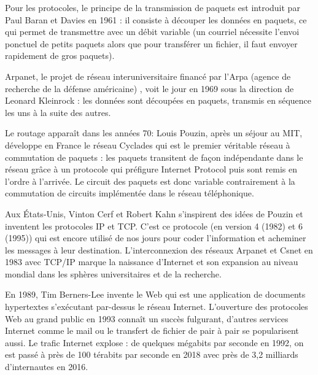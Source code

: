 \documentclass[a4paper,dvipsnames]{article}
\begin{document}
\smallskip

Pour les protocoles,
le principe de la {\color{red}transmission de paquets} est introduit par Paul Baran et Davies en 1961 : il consiste à découper les données en paquets, ce qui permet de transmettre avec un débit variable (un courriel nécessite l'envoi ponctuel de petits paquets alors que pour transférer un fichier, il faut envoyer rapidement de gros paquets).

\smallskip

{\color{red}Arpanet}, le projet de réseau interuniversitaire financé par l'Arpa (agence de recherche de la défense américaine) , voit le jour en 1969 sous la direction de Leonard Kleinrock : les données sont découpées en paquets, transmis en séquence les uns à la suite des autres.

\smallskip

Le routage apparaît dans les années 70: Louis Pouzin, après un séjour au MIT, développe en France le réseau {\color{red}Cyclades} qui est le premier véritable réseau à {\color{red}commutation de paquets} : les paquets transitent de façon indépendante dans le réseau grâce à un protocole qui préfigure Internet Protocol puis sont remis en l'ordre à l'arrivée. Le circuit des paquets est donc variable contrairement à la {\color{red}commutation de circuits} implémentée dans le réseau téléphonique.

\smallskip

Aux États-Unis, Vinton Cerf et Robert Kahn s'inspirent des idées de Pouzin et
inventent les protocoles {\color{red}IP} et {\color{red}TCP}. C'est ce protocole
(en version 4 (1982) et 6 (1995)) qui est encore utilisé de nos jours pour coder l'information
et acheminer les messages à leur destination. L'interconnexion des réseaux
Arpanet et Csnet en 1983 avec {\color{red}TCP/IP} marque la naissance d'Internet
et son expansion au niveau mondial dans les sphères universitaires et de la
recherche.

\smallskip

En 1989, Tim Berners-Lee invente le {\color{red}Web} qui est une application de documents hypertextes s'exécutant par-dessus le réseau {\color{red}Internet}. L'ouverture des protocoles Web au grand public en 1993 connaît un succès fulgurant, d'autres services Internet comme le mail ou le transfert de fichier de pair à pair se popularisent aussi. Le trafic Internet explose : de quelques mégabits par seconde en 1992, on est passé à près de 100 térabits par seconde en 2018 avec près de 3,2 milliards d'internautes en 2016.
\end{document}
